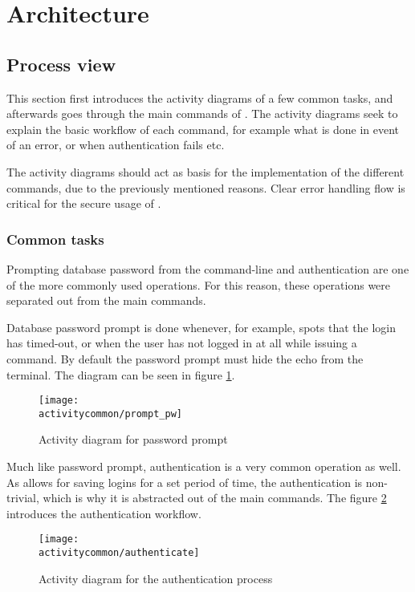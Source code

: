 \section{Architecture}

\subsection{Process view}

This section first introduces the activity diagrams of a few common tasks, and
afterwards goes through the main commands of \pman. The activity
diagrams seek to explain the basic workflow of each command, for example what
is done in event of an error, or when authentication fails etc.

The activity diagrams should act as basis for the implementation of the different
commands, due to the previously mentioned reasons. Clear error handling flow is
critical for the secure usage of \pman.

\subsubsection{Common tasks}

Prompting database password from the command-line and authentication are one of
the more commonly used operations. For this reason, these operations were separated
out from the main commands.

Database password prompt is done whenever, for example, \pman spots that
the login has timed-out, or when the user has not logged in at all while issuing
a command. By default the password prompt must hide the echo from the terminal.
The diagram can be seen in figure \ref{dia:prompt_pw}.

\begin{figure}[H]
    \centering
    \texttt{[image: \\activitycommon/prompt\_pw]}
    \caption{Activity diagram for password prompt}
    \label{dia:prompt_pw}
\end{figure}

Much like password prompt, authentication is a very common operation as well.
As \pman allows for saving logins for a set period of time, the
authentication is non-trivial, which is why it is abstracted out of the main
commands. The figure \ref{dia:authenticate} introduces the authentication
workflow.

\begin{figure}[H]
    \centering
    \texttt{[image: \\activitycommon/authenticate]}
    \caption{Activity diagram for the authentication process}
    \label{dia:authenticate}
\end{figure}

